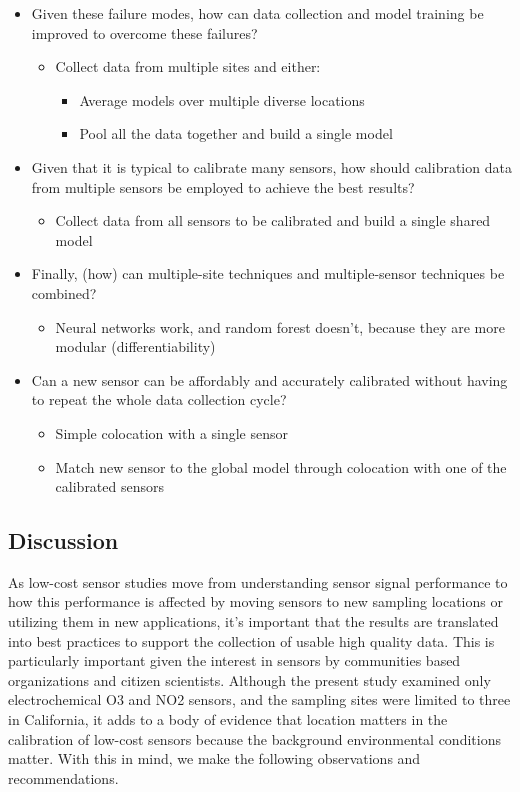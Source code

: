 \documentclass[journal abbreviation, manuscript]{copernicus}
\begin{document}
\begin{itemize}
    \item Given these failure modes, how can data collection and model training be improved to overcome these failures?
      \begin{itemize}
          \item Collect data from multiple sites and either:
          \begin{itemize}
            \item Average models over multiple diverse locations 
            \item Pool all the data together and build a single model
          \end{itemize}
      \end{itemize}
    \item Given that it is typical to calibrate many sensors, how should calibration data from multiple sensors be employed to achieve the best results?
      \begin{itemize}
          \item Collect data from all sensors to be calibrated and build a single shared model
      \end{itemize}
    \item Finally, (how) can multiple-site techniques and multiple-sensor techniques be combined?
      \begin{itemize}
         \item Neural networks work, and random forest doesn’t, because they are more modular (differentiability)
      \end{itemize}
    \item Can a new sensor can be affordably and accurately calibrated without having to repeat the whole data collection cycle?
      \begin{itemize}
          \item Simple colocation with a single sensor
          \item Match new sensor to the global model through colocation with one of the calibrated sensors
      \end{itemize}
\end{itemize}
\fi

\subsection{Discussion}

As low-cost sensor studies move from understanding sensor signal performance to how this performance is affected by moving sensors to new sampling locations or utilizing them in new applications, it’s important that the results are translated into best practices to support the collection of usable high quality data. This is particularly important given the interest in sensors by communities based organizations and citizen scientists. Although the present study examined only electrochemical O3 and NO2 sensors, and the sampling sites were limited to three in California, it adds to a body of evidence that location matters in the calibration of low-cost sensors because the background environmental conditions matter.  With this in mind, we make the following observations and recommendations.
\end{document}
